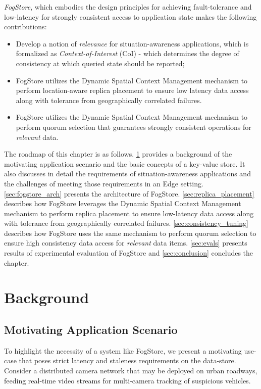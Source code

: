{\it FogStore}, which embodies the design principles for achieving fault-tolerance and low-latency for strongly consistent access to application state makes the following contributions:
\begin{itemize}
    \item Develop a notion of \textit{relevance} for situation-awareness applications, which is formalized as \textit{Context-of-Interest} (CoI) - which determines the degree of consistency at which queried state should be reported;
    \item FogStore utilizes the Dynamic Spatial Context Management mechanism to perform location-aware replica placement to ensure low latency data access along with tolerance from geographically correlated failures.
    \item FogStore utilizes the Dynamic Spatial Context Management mechanism to perform quorum selection that guarantees strongly consistent operations for \emph{relevant} data.
\end{itemize}
The roadmap of this chapter is as follows. \cref{sec:background} provides a background of the motivating application scenario and the basic concepts of a key-value store. It also discusses in detail the requirements of situation-awareness applications and the challenges of meeting those requirements in an Edge setting. \cref{sec:fogstore_arch} presents the architecture of FogStore. \cref{sec:replica_placement} describes how FogStore leverages the Dynamic Spatial Context Management mechanism to perform replica placement to ensure low-latency data access along with tolerance from geographically correlated failures. \cref{sec:consistency_tuning} describes how FogStore uses the same mechanism to perform quorum selection to ensure high consistency data access for \textit{relevant} data items. \cref{sec:evals} presents results of experimental evaluation of FogStore and \cref{sec:conclusion} concludes the chapter.

\section{Background}
\label{sec:background}

\subsection{Motivating Application Scenario}
\label{sec:fogstore_application}
To highlight the necessity of a system like FogStore, we present a motivating use-case that poses strict latency and staleness requirements on the data-store. Consider a distributed camera network that may be deployed on urban roadways, feeding real-time video streams for multi-camera tracking of suspicious vehicles. 

